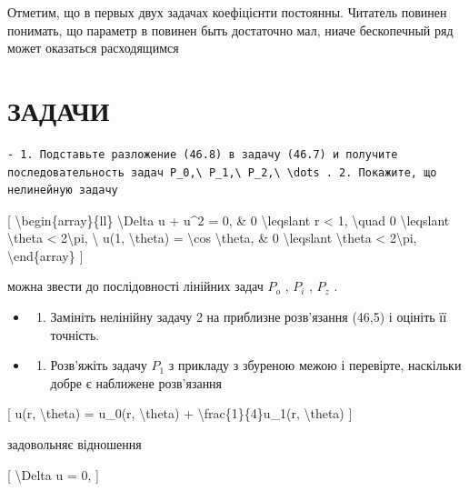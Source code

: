 \documentclass[
]{article}
\providecommand{\tightlist}{%
  \setlength{\itemsep}{0pt}\setlength{\parskip}{0pt}}
\begin{document}
Отметим, що в первых двух задачах коефіцієнти постоянны. Читатель
повинен понимать, що параметр в повинен быть достаточно мал, ниаче
бескопечный ряд может оказаться расходящимся

\section{ЗАДАЧИ}\label{ux437ux430ux434ux430ux447ux438-20}

\begin{verbatim}
- 1. Подставьте разложение (46.8) в задачу (46.7) и получите последовательность задач P_0,\ P_1,\ P_2,\ \dots . 2. Покажите, що нелинейную задачу
\end{verbatim}

{[} \textbackslash begin\{array\}\{ll\} \textbackslash Delta u + u\^{}2
= 0, \& 0 \textbackslash leqslant r \textless{} 1, \textbackslash quad 0
\textbackslash leqslant \textbackslash theta \textless{}
2\textbackslash pi, \textbackslash{} u(1, \textbackslash theta) =
\textbackslash cos \textbackslash theta, \& 0 \textbackslash leqslant
\textbackslash theta \textless{} 2\textbackslash pi,
\textbackslash end\{array\} {]}

можна звести до послідовності лінійних задач \(P_{o}\) , \(P_{i}\) ,
\(P_{z}\) .

\begin{itemize}
\tightlist
\item
  \begin{enumerate}
  \def\labelenumi{\arabic{enumi}.}
  \setcounter{enumi}{2}
  \tightlist
  \item
    Замініть нелінійну задачу 2 на приблизне розв'язання (46,5) і
    оцініть її точність.
  \end{enumerate}
\item
  \begin{enumerate}
  \def\labelenumi{\arabic{enumi}.}
  \setcounter{enumi}{3}
  \tightlist
  \item
    Розв'яжіть задачу \(P_1\) з прикладу з збуреною межою і перевірте,
    наскільки добре є наближене розв'язання
  \end{enumerate}
\end{itemize}

{[} u(r, \textbackslash theta) = u\_0(r, \textbackslash theta) +
\textbackslash frac\{1\}\{4\}u\_1(r, \textbackslash theta) {]}

задовольняє відношення

{[} \textbackslash Delta u = 0, {]}
\end{document}
